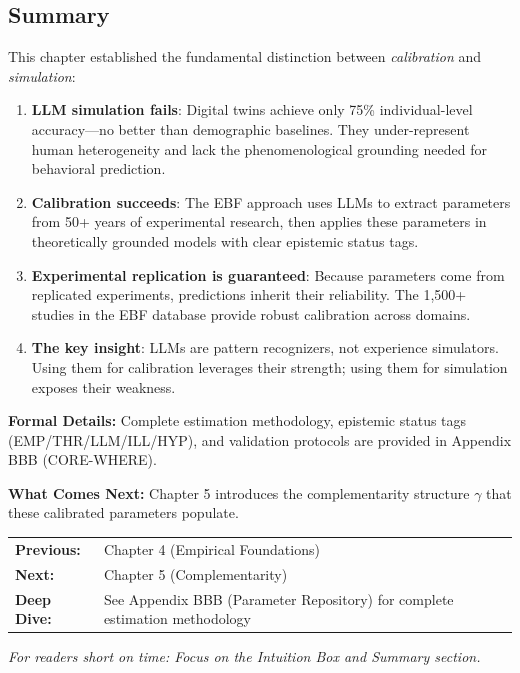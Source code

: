 \subsection{Summary}
\label{sec:ch4x-summary}

This chapter established the fundamental distinction between \emph{calibration} and \emph{simulation}:

\begin{enumerate}
\item \textbf{LLM simulation fails}: Digital twins achieve only 75\% individual-level accuracy---no better than demographic baselines. They under-represent human heterogeneity and lack the phenomenological grounding needed for behavioral prediction.

\item \textbf{Calibration succeeds}: The EBF approach uses LLMs to extract parameters from 50+ years of experimental research, then applies these parameters in theoretically grounded models with clear epistemic status tags.

\item \textbf{Experimental replication is guaranteed}: Because parameters come from replicated experiments, predictions inherit their reliability. The 1,500+ studies in the EBF database provide robust calibration across domains.

\item \textbf{The key insight}: LLMs are pattern recognizers, not experience simulators. Using them for calibration leverages their strength; using them for simulation exposes their weakness.
\end{enumerate}

\textbf{Formal Details:} Complete estimation methodology, epistemic status tags (EMP/THR/LLM/ILL/HYP), and validation protocols are provided in Appendix BBB (CORE-WHERE).

\textbf{What Comes Next:} Chapter 5 introduces the complementarity structure $\gamma$ that these calibrated parameters populate.

\begin{tcolorbox}[
    colback=green!5!white,
    colframe=green!75!black,
    title={\textbf{Reading Path}},
    fonttitle=\bfseries
]
\begin{tabular}{@{}ll@{}}
\textbf{Previous:} & Chapter 4 (Empirical Foundations) \\
\textbf{Next:} & Chapter 5 (Complementarity) \\
\textbf{Deep Dive:} & See Appendix BBB (Parameter Repository) for complete estimation methodology \\
\end{tabular}

\medskip
\textit{For readers short on time: Focus on the Intuition Box and Summary section.}
\end{tcolorbox}

